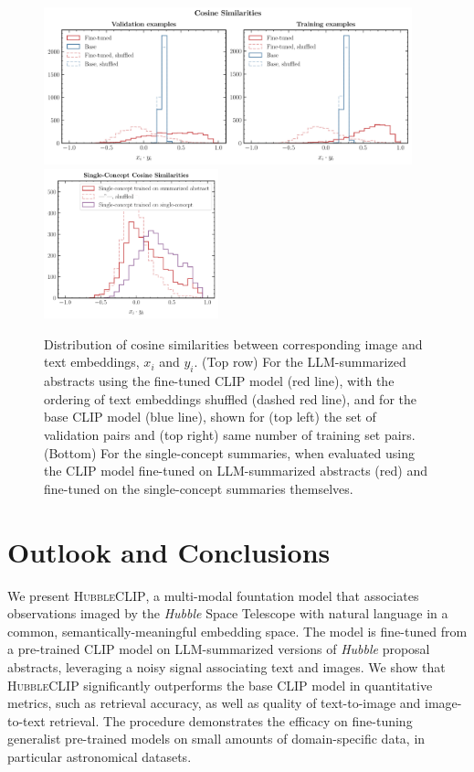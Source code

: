 \documentclass[10pt]{article} %
\newcommand{\hubble}{\emph{Hubble}\xspace}
\begin{document}
\begin{figure}[!h]
\includegraphics[width=0.95\textwidth]{plots/sim_valtrain.pdf}
\centering\includegraphics[width=0.45\textwidth]{plots/sim_summ1.pdf}
\caption{Distribution of cosine similarities between corresponding image and text embeddings, $x_i$ and $y_i$. (Top row) For the LLM-summarized abstracts using the fine-tuned CLIP model (red line), with the ordering of text embeddings shuffled (dashed red line), and for the base CLIP model (blue line), shown for (top left) the set of validation pairs and (top right) same number of training set pairs. (Bottom) For the single-concept summaries, when evaluated using the CLIP model fine-tuned on LLM-summarized abstracts (red) and fine-tuned on the single-concept summaries themselves.}
\label{fig:sim_valtrain}
\end{figure}

\section{Outlook and Conclusions}
\label{sec:conclusion}

We present \textsc{HubbleCLIP}, a multi-modal fountation model that associates observations imaged by the \hubble Space Telescope with natural language in a common, semantically-meaningful embedding space. The model is fine-tuned from a pre-trained CLIP model on LLM-summarized versions of \hubble proposal abstracts, leveraging a noisy signal associating text and images. We show that \textsc{HubbleCLIP} significantly outperforms the base CLIP model in quantitative metrics, such as retrieval accuracy, as well as quality of text-to-image and image-to-text retrieval. The procedure demonstrates the efficacy on fine-tuning generalist pre-trained models on small amounts of domain-specific data, in particular astronomical datasets.
\end{document}
